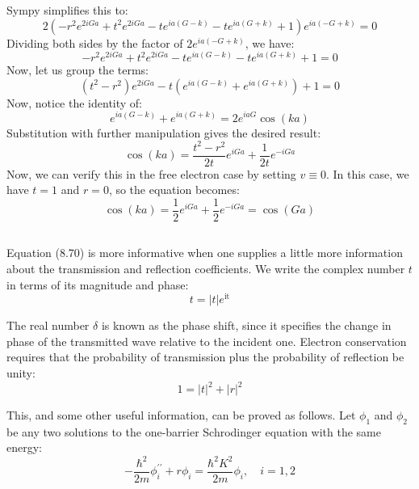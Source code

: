 \documentclass[12pt]{article}
\begin{document}
Sympy simplifies this to:
\begin{equation}
    2 \left(- r^{2} e^{2 i G a} + t^{2} e^{2 i G a} - t e^{i a \left(G - k\right)} - t e^{i a \left(G + k\right)} + 1\right) e^{i a \left(- G + k\right)} = 0
\end{equation}
Dividing both sides by the factor of $2e^{i a \left(- G + k\right)}$, we have:
\begin{equation}
    - r^{2} e^{2 i G a} + t^{2} e^{2 i G a} - t e^{i a \left(G - k\right)} - t e^{i a \left(G + k\right)} + 1 = 0
\end{equation}
Now, let us group the terms:
\begin{equation}
    \left(t^{2} - r^{2}\right) e^{2 i G a} - t \left(e^{i a \left(G - k\right)} + e^{i a \left(G + k\right)}\right) + 1 = 0
\end{equation}
Now, notice the identity of:
\begin{equation}
    e^{i a \left(G - k\right)} + e^{i a \left(G + k\right)} = 2e^{i a G} \cos(ka)
\end{equation}
Substitution with further manipulation gives the desired result:
\begin{equation}
    \cos(ka) = \frac{t^2 - r^2}{2t} e^{iGa} + \frac{1}{2t} e^{-iGa}
\end{equation}
Now, we can verify this in the free electron case by setting $v\equiv 0$. In this case, we have $t=1$ and $r=0$, so the equation becomes:
\begin{equation}
    \cos(ka) = \frac{1}{2} e^{iGa} + \frac{1}{2} e^{-iGa} = \cos(Ga)
\end{equation}
\subsection{}
Equation (8.70) is more informative when one supplies a little more information about the transmission and reflection coefficients. We write the complex number $t$ in terms of its magnitude and phase:
$$
t=|t| e^{\mathrm{it}}
$$

The real number $\delta$ is known as the phase shift, since it specifies the change in phase of the transmitted wave relative to the incident one. Electron conservation requires that the probability of transmission plus the probability of reflection be unity:
$$
1=|t|^2+|r|^2
$$

This, and some other useful information, can be proved as follows. Let $\phi_1$ and $\phi_2$ be any two solutions to the one-barrier Schrodinger equation with the same energy:
$$
-\frac{\hbar^2}{2 m} \phi_i^{\prime \prime}+r \phi_i=\frac{\hbar^2 K^2}{2 m} \phi_i, \quad i=1,2
$$
\end{document}

